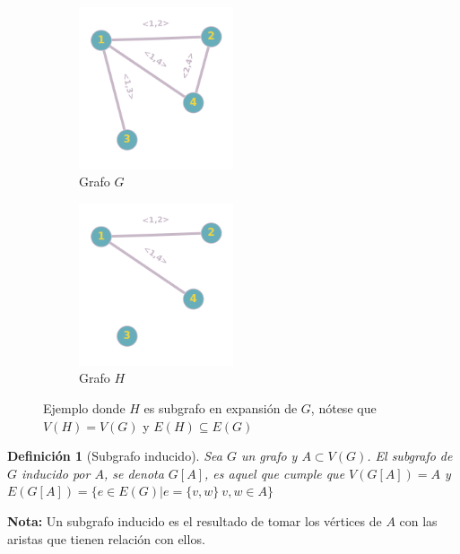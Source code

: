 \documentclass[a4paper,1pt]{report}
\newtheorem*{dfn}{Definición}
\begin{document}
\begin{figure}[H]
\centering
\begin{subfigure}[b]{0.45\textwidth}
\centering
\includegraphics[width=0.5\textwidth]{figures/grafo2.png}
\caption{Grafo $G$}
\end{subfigure}
\begin{subfigure}[b]{0.45\textwidth}
    \centering
\includegraphics[width=0.5\textwidth]{figures/expansion.png}
\caption{Grafo $H$}
\end{subfigure}
\caption{Ejemplo donde $H$ es subgrafo en expansi\'on de $G$, n\'otese que $V(H) = V(G)$ y $E(H) \subseteq E(G)$}
\end{figure} 

\begin{dfn}[Subgrafo inducido]
    Sea $G$ un grafo y $A \subset V(G)$. El subgrafo de $G$ inducido por $A$, se denota $G[A]$, es aquel que cumple que $V(G[A]) = A$ y $E(G[A]) = \{e \in E(G)| e = \{v,w\} ~ v,w \in A \}$
\end{dfn}
\textbf{Nota:} Un subgrafo inducido es el resultado de tomar los vértices de $A$ con las aristas que tienen relación con
ellos.
\end{document}
